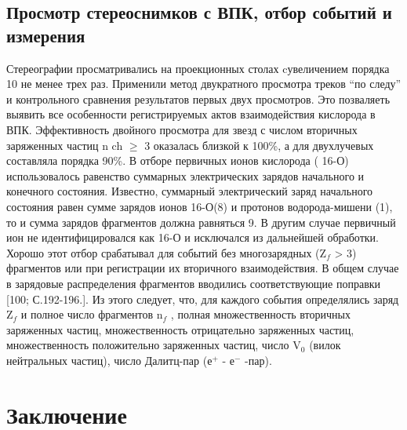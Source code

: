 \documentclass[fontsize=14pt]{scrarticle}
\begin{document}
\subsection{Просмотр стереоснимков с ВПК, отбор событий и измерения}
\hspace{0.6cm}
Стереографии просматривались на проекционных столах cувеличением
порядка 10 не менее трех раз. Применили метод двукратного просмотра
треков “по следу” и контрольного сравнения результатов первых двух
просмотров. Это позваляеть выявить все особенности регистрируемых актов взаимодействия кислорода в ВПК. Эффективность двойного просмотра для звезд с числом вторичных заряженных частиц n ch $\ge$ 3 оказалась близкой к 100\%, а для двухлучевых составляла порядка 90\%. В отборе первичных ионов кислорода ( 16-О) использовалось равенство суммарных электрических зарядов начального и конечного состояния.
Известно, суммарный электрический заряд начального состояния равен сумме зарядов ионов 16-О(8) и протонов водорода-мишени (1), то и сумма зарядов фрагментов должна равняться 9. В другим случае первичный ион не идентифицировался как 16-О и исключался из дальнейшей обработки. Хорошо этот отбор срабатывал для
событий без многозарядных (Z$_{f}$ > 3) фрагментов или при регистрации их вторичного взаимодействия. В общем случае в зарядовые распределения фрагментов вводились соответствующие поправки [100; С.192-196.]. Из этого следует, что, для каждого события определялись заряд Z$_{f}$ и полное число
фрагментов n$_{f}$ , полная множественность вторичных заряженных частиц, множественность отрицательно заряженных частиц, множественность положительно заряженных частиц, число V$_{0}$ (вилок
нейтральных частиц), число Далитц-пар (е$^{+}$ - е$^{-}$ -пар).

\newpage

\section*{Заключение}
\end{document}
